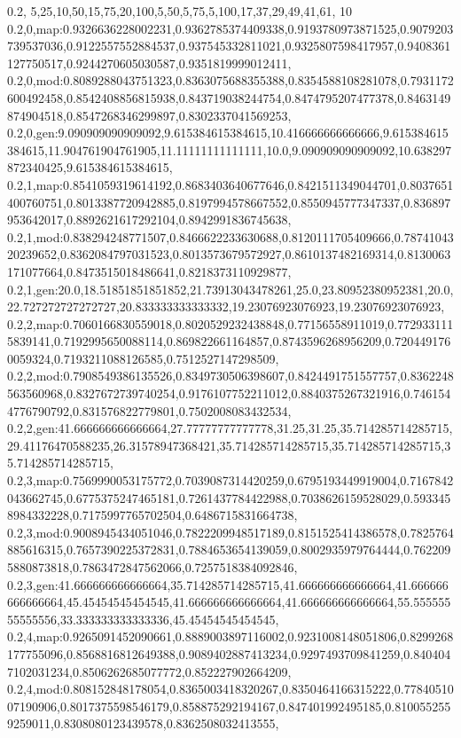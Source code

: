 0.2,
5,25,10,50,15,75,20,100,5,50,5,75,5,100,17,37,29,49,41,61,
10
0.2,0,map:0.9326636228002231,0.9362785374409338,0.9193780973871525,0.9079203739537036,0.9122557552884537,0.937545332811021,0.9325807598417957,0.9408361127750517,0.9244270605030587,0.9351819999012411,
0.2,0,mod:0.8089288043751323,0.8363075688355388,0.8354588108281078,0.7931172600492458,0.8542408856815938,0.843719038244754,0.8474795207477378,0.8463149874904518,0.8547268346299897,0.8302337041569253,
0.2,0,gen:9.090909090909092,9.615384615384615,10.416666666666666,9.615384615384615,11.904761904761905,11.11111111111111,10.0,9.090909090909092,10.638297872340425,9.615384615384615,
0.2,1,map:0.8541059319614192,0.8683403640677646,0.8421511349044701,0.8037651400760751,0.8013387720942885,0.8197994578667552,0.8550945777347337,0.836897953642017,0.8892621617292104,0.8942991836745638,
0.2,1,mod:0.838294248771507,0.8466622233630688,0.8120111705409666,0.7874104320239652,0.8362084797031523,0.8013573679572927,0.8610137482169314,0.8130063171077664,0.8473515018486641,0.8218373110929877,
0.2,1,gen:20.0,18.51851851851852,21.73913043478261,25.0,23.80952380952381,20.0,22.727272727272727,20.833333333333332,19.23076923076923,19.23076923076923,
0.2,2,map:0.7060166830559018,0.8020529232438848,0.77156558911019,0.7729331115839141,0.7192995650088114,0.869822661164857,0.8743596268956209,0.7204491760059324,0.7193211088126585,0.7512527147298509,
0.2,2,mod:0.7908549386135526,0.8349730506398607,0.8424491751557757,0.8362248563560968,0.8327672739740254,0.9176107752211012,0.8840375267321916,0.7461544776790792,0.831576822779801,0.7502008083432534,
0.2,2,gen:41.666666666666664,27.77777777777778,31.25,31.25,35.714285714285715,29.41176470588235,26.31578947368421,35.714285714285715,35.714285714285715,35.714285714285715,
0.2,3,map:0.7569990053175772,0.7039087314420259,0.6795193449919004,0.7167842043662745,0.6775375247465181,0.7261437784422988,0.7038626159528029,0.5933458984332228,0.7175997765702504,0.6486715831664738,
0.2,3,mod:0.9008945434051046,0.7822209948517189,0.8151525414386578,0.7825764885616315,0.7657390225372831,0.7884653654139059,0.8002935979764444,0.7622095880873818,0.7863472847562066,0.7257518384092846,
0.2,3,gen:41.666666666666664,35.714285714285715,41.666666666666664,41.666666666666664,45.45454545454545,41.666666666666664,41.666666666666664,55.55555555555556,33.333333333333336,45.45454545454545,
0.2,4,map:0.9265091452090661,0.8889003897116002,0.9231008148051806,0.8299268177755096,0.8568816812649388,0.9089402887413234,0.9297493709841259,0.8404047102031234,0.8506262685077772,0.852227902664209,
0.2,4,mod:0.808152848178054,0.8365003418320267,0.8350464166315222,0.7784051007190906,0.8017375598546179,0.858875292194167,0.847401992495185,0.8100552559259011,0.8308080123439578,0.8362508032413555,
